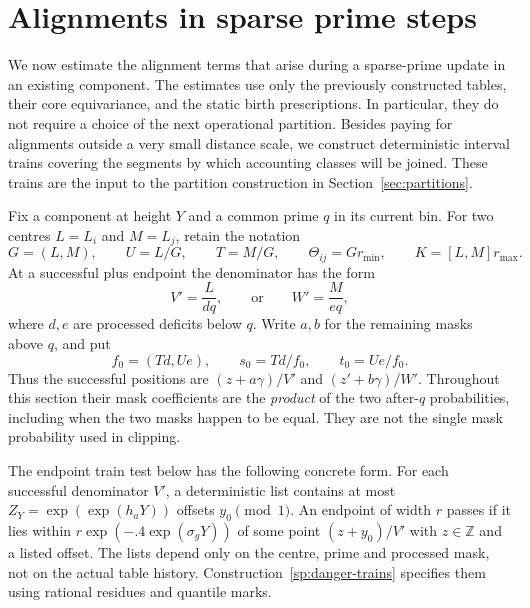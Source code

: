 \section{Alignments in sparse prime steps}\label{sec:sparse}

We now estimate the alignment terms that arise during a sparse-prime
update in an existing component.  The estimates use only the previously
constructed tables, their core equivariance, and the static birth
prescriptions.  In particular, they do not require a choice of the next
operational partition.  Besides paying for alignments outside a very small
distance scale, we construct deterministic interval trains covering the
segments by which accounting classes will be joined.  These trains are
the input to the partition construction in Section~\ref{sec:partitions}.

Fix a component at height $Y$ and a common prime $q$ in its current bin.
For two centres $L=L_i$ and $M=L_j$, retain the notation
\[
 G=(L,M),\qquad U=L/G,\qquad T=M/G,\qquad
 \Theta_{ij}=G r_{\min},\qquad K=[L,M]r_{\max}.
\]
At a successful plus endpoint the denominator has the form
\[
 V'=\frac{L}{dq},\qquad\text{or}\qquad W'=\frac{M}{eq},
\]
where $d,e$ are processed deficits below $q$.  Write $a,b$ for the
remaining masks above $q$, and put
\begin{equation}\label{sp:signatures}
 f_0=(Td,Ue),\qquad s_0=Td/f_0,\qquad t_0=Ue/f_0.
\end{equation}
Thus the successful positions are $(z+a\gamma)/V'$ and
$(z'+b\gamma)/W'$.  Throughout this section their mask coefficients are
the \emph{product} of the two after-$q$ probabilities, including when the
two masks happen to be equal.  They are not the single mask probability
used in clipping.

The endpoint train test below has the following concrete form.  For each
successful denominator $V'$, a deterministic list contains at most
$Z_Y=\exp(\exp(h_aY))$ offsets $y_0\pmod1$.  An endpoint of width $r$
passes if it lies within $r\exp(-.4\exp(\sigma_gY))$ of some point
$(z+y_0)/V'$ with $z\in\mathbb Z$ and a listed offset.  The lists depend
only on the centre, prime and processed mask, not on the actual table
history.  Construction~\ref{sp:danger-trains} specifies them using
rational residues and quantile marks.

